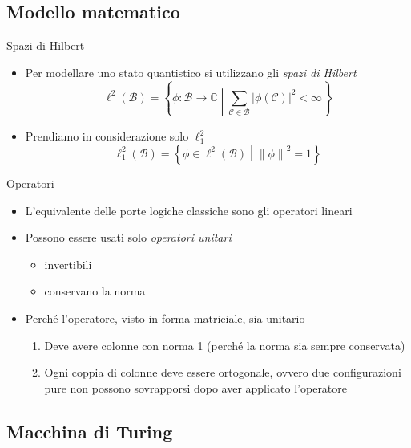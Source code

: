 \documentclass{beamer}
\def\spacedmiddle#1{\mathrel{}\middle#1\mathrel{}}
\begin{document}
\subsection{Modello matematico}

\begin{frame}{\subsecname}{Spazi di Hilbert}
	\begin{itemize}
		\item Per modellare uno stato quantistico si utilizzano gli \textit{spazi di Hilbert}
		\[ \ell^{2} \left ( \mathcal{B} \right ) = \left \{ \phi : \mathcal{B} \rightarrow \mathbb{C} \spacedmiddle | \sum_{\mathcal{C} \in \mathcal{B}} \left | \phi \left ( \mathcal{C} \right ) \right |^{2} < \infty \right \}\]
		\item Prendiamo in considerazione solo \(\ell^{2}_{1}\)
		\[ \ell^{2}_{1} \left ( \mathcal{B} \right ) = \left \{ \phi \in \ell^{2} \left ( \mathcal{B} \right ) \spacedmiddle | \left \| \phi \right \|^{2} = 1 \right \}\]
	\end{itemize}
\end{frame}

\begin{frame}{\subsecname}{Operatori}
	\begin{itemize}
		\item L'equivalente delle porte logiche classiche sono gli operatori lineari
		\item Possono essere usati solo \textit{operatori unitari}
		\begin{itemize}
			\item invertibili
			\item conservano la norma
		\end{itemize}
		\item Perché l'operatore, visto in forma matriciale, sia unitario
		\begin{enumerate}
			\item Deve avere colonne con norma 1 (perché la norma sia sempre conservata)
			\item Ogni coppia di colonne deve essere ortogonale, ovvero due configurazioni pure non possono sovrapporsi dopo aver applicato l'operatore
		\end{enumerate}
	\end{itemize}
\end{frame}

\subsection{Macchina di Turing}
\end{document}
